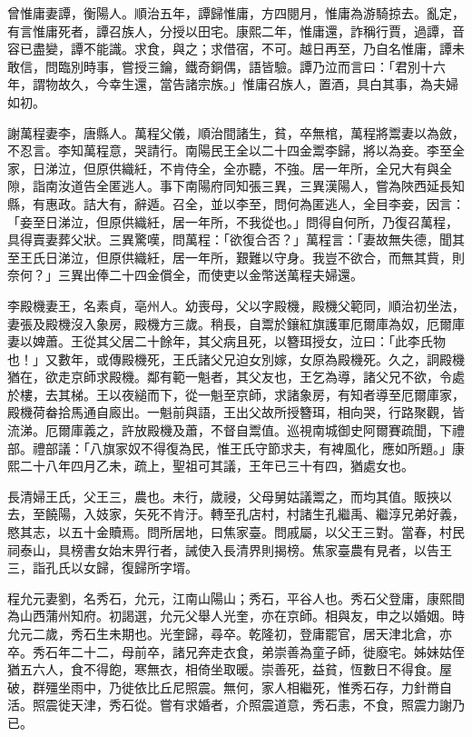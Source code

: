 \begin{pinyinscope}
曾惟庸妻譚，衡陽人。順治五年，譚歸惟庸，方四閱月，惟庸為游騎掠去。亂定，有言惟庸死者，譚召族人，分授以田宅。康熙二年，惟庸還，詐稱行賈，過譚，音容已盡變，譚不能識。求食，與之；求借宿，不可。越日再至，乃自名惟庸，譚未敢信，問臨別時事，嘗授三鑰，鐵奇銅偶，語皆驗。譚乃泣而言曰：「君別十六年，謂物故久，今幸生還，當告諸宗族。」惟庸召族人，置酒，具白其事，為夫婦如初。

謝萬程妻李，唐縣人。萬程父儀，順治間諸生，貧，卒無棺，萬程將鬻妻以為斂，不忍言。李知萬程意，哭請行。南陽民王全以二十四金鬻李歸，將以為妾。李至全家，日涕泣，但原供織紝，不肯侍全，全亦聽，不強。居一年所，全兄大有與全隙，詣南汝道告全匿逃人。事下南陽府同知張三異，三異漢陽人，嘗為陜西延長知縣，有惠政。詰大有，辭遁。召全，並以李至，問何為匿逃人，全目李妾，因言：「妾至日涕泣，但原供織紝，居一年所，不我從也。」問得自何所，乃復召萬程，具得賣妻葬父狀。三異驚嘆，問萬程：「欲復合否？」萬程言：「妻故無失德，聞其至王氏日涕泣，但原供織紝，居一年所，艱難以守身。我豈不欲合，而無其貲，則奈何？」三異出俸二十四金償全，而使吏以金幣送萬程夫婦還。

李殿機妻王，名素貞，亳州人。幼喪母，父以字殿機，殿機父範同，順治初坐法，妻張及殿機沒入象房，殿機方三歲。稍長，自鬻於鑲紅旗護軍厄爾庫為奴，厄爾庫妻以婢蕭。王從其父居二十餘年，其父病且死，以簪珥授女，泣曰：「此李氏物也！」又數年，或傳殿機死，王氏諸父兄迫女別嫁，女原為殿機死。久之，詗殿機猶在，欲走京師求殿機。鄰有範一魁者，其父友也，王乞為導，諸父兄不欲，令處於樓，去其梯。王以夜縋而下，從一魁至京師，求諸象房，有知者導至厄爾庫家，殿機荷畚拾馬通自廄出。一魁前與語，王出父故所授簪珥，相向哭，行路聚觀，皆流涕。厄爾庫義之，許放殿機及蕭，不督自鬻值。巡視南城御史阿爾賽疏聞，下禮部。禮部議：「八旗家奴不得復為民，惟王氏守節求夫，有裨風化，應如所題。」康熙二十八年四月乙未，疏上，聖祖可其議，王年已三十有四，猶處女也。

長清婦王氏，父王三，農也。未行，歲祲，父母舅姑議鬻之，而均其值。販挾以去，至饒陽，入妓家，矢死不肯汙。轉至孔店村，村諸生孔繼禹、繼淳兄弟好義，愍其志，以五十金贖焉。問所居地，曰焦家臺。問戚屬，以父王三對。當春，村民祠泰山，具榜書女始末畀行者，誡使入長清界則揭榜。焦家臺農有見者，以告王三，詣孔氏以女歸，復歸所字壻。

程允元妻劉，名秀石，允元，江南山陽山；秀石，平谷人也。秀石父登庸，康熙間為山西蒲州知府。初謁選，允元父舉人光奎，亦在京師。相與友，申之以婚姻。時允元二歲，秀石生未期也。光奎歸，尋卒。乾隆初，登庸罷官，居天津北倉，亦卒。秀石年二十二，母前卒，諸兄奔走衣食，弟崇善為童子師，徙廢宅。姊妹姑侄猶五六人，食不得飽，寒無衣，相倚坐取暖。崇善死，益貧，恆數日不得食。屋破，群殭坐雨中，乃徙依比丘尼照震。無何，家人相繼死，惟秀石存，力針黹自活。照震徙天津，秀石從。嘗有求婚者，介照震道意，秀石恚，不食，照震力謝乃已。


\end{pinyinscope}
